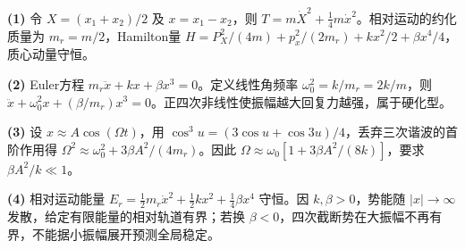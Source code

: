 \par\noindent\textbf{(1)} 令 \(X=(x_1+x_2)/2\) 及 \(x=x_1-x_2\)，则 \(T=m\dot X^2+\frac14m\dot x^2\)。相对运动的约化质量为 \(m_r=m/2\)，Hamilton量 \(H=P_X^2/(4m)+p_x^2/(2m_r)+kx^2/2+\beta x^4/4\)，质心动量守恒。
\par\noindent\textbf{(2)} Euler方程 \(m_r\ddot x+kx+\beta x^3=0\)。定义线性角频率 \(\omega_0^2=k/m_r=2k/m\)，则 \(\ddot x+\omega_0^2x+(\beta/m_r)x^3=0\)。正四次非线性使振幅越大回复力越强，属于硬化型。
\par\noindent\textbf{(3)} 设 \(x\approx A\cos(\Omega t)\)，用 \(\cos^3u=(3\cos u+\cos3u)/4\)，丢弃三次谐波的首阶作用得 \(\Omega^2\approx\omega_0^2+3\beta A^2/(4m_r)\)。因此 \(\Omega\approx\omega_0[1+3\beta A^2/(8k)]\)，要求 \(\beta A^2/k\ll1\)。
\par\noindent\textbf{(4)} 相对运动能量 \(E_r=\frac12m_r\dot x^2+\frac12kx^2+\frac14\beta x^4\) 守恒。因 \(k,\beta>0\)，势能随 \(|x|\to\infty\) 发散，给定有限能量的相对轨道有界；若换 \(\beta<0\)，四次截断势在大振幅不再有界，不能据小振幅展开预测全局稳定。
